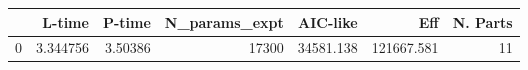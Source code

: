 \begin{tabular}{lrrrrrr}
\toprule
{} &    L-time &   P-time &  N\_params\_expt &   AIC-like &         Eff &  N. Parts \\
\midrule
0 &  3.344756 &  3.50386 &          17300 &  34581.138 &  121667.581 &        11 \\
\bottomrule
\end{tabular}
